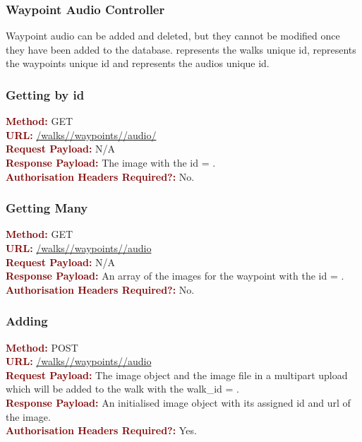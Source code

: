 \documentclass[11pt,a4paper]{report}
\begin{document}
\subsubsection{Waypoint Audio Controller}
Waypoint audio can be added and deleted, but they cannot be modified once they have been added to the database.  represents the walks unique id,  represents the waypoints unique id and  represents the audios unique id. 

\subsubsection{Getting by id}
\textbf{\textcolor{Maroon}{Method:}} GET\\
\textbf{\textcolor{Maroon}{URL:}} \url{/walks/}\url{/waypoints/}\url{/audio/}\\
\textbf{\textcolor{Maroon}{Request Payload:}} N/A\\
\textbf{\textcolor{Maroon}{Response Payload:}} The image with the id = .\\
\textbf{\textcolor{Maroon}{Authorisation Headers Required?:}} No.

\subsubsection{Getting Many}
\textbf{\textcolor{Maroon}{Method:}} GET\\
\textbf{\textcolor{Maroon}{URL:}} \url{/walks/}\url{/waypoints/}\url{/audio}\\
\textbf{\textcolor{Maroon}{Request Payload:}} N/A\\
\textbf{\textcolor{Maroon}{Response Payload:}} An array of the images for the waypoint with the id = .\\
\textbf{\textcolor{Maroon}{Authorisation Headers Required?:}} No.

\subsubsection{Adding}
\textbf{\textcolor{Maroon}{Method:}} POST\\
\textbf{\textcolor{Maroon}{URL:}} \url{/walks/}\url{/waypoints/}\url{/audio}\\
\textbf{\textcolor{Maroon}{Request Payload:}} The image object and the image file in a multipart upload which will be added to the walk with the walk\_id = .\\
\textbf{\textcolor{Maroon}{Response Payload:}} An initialised image object with its assigned id and url of the image.\\
\textbf{\textcolor{Maroon}{Authorisation Headers Required?:}} Yes.
\end{document}
